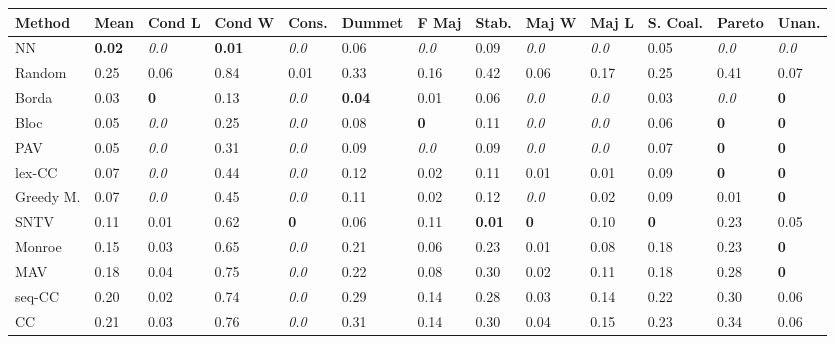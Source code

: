 \begin{tabular}{lllllllllllll}
\toprule
Method & Mean & Cond L & Cond W & Cons. & Dummet & F Maj & Stab. & Maj W & Maj L & S. Coal. & Pareto & Unan. \\
\midrule
NN & \textbf{0.02} & \textit{0.0} & \textbf{0.01} & \textit{0.0} & 0.06 & \textit{0.0} & 0.09 & \textit{0.0} & \textit{0.0} & 0.05 & \textit{0.0} & \textit{0.0} \\
Random & 0.25 & 0.06 & 0.84 & 0.01 & 0.33 & 0.16 & 0.42 & 0.06 & 0.17 & 0.25 & 0.41 & 0.07 \\
Borda & 0.03 & \textbf{0} & 0.13 & \textit{0.0} & \textbf{0.04} & 0.01 & 0.06 & \textit{0.0} & \textit{0.0} & 0.03 & \textit{0.0} & \cellcolor{green!25}\textbf{0} \\
Bloc & 0.05 & \textit{0.0} & 0.25 & \textit{0.0} & 0.08 & \textbf{0} & 0.11 & \textit{0.0} & \textit{0.0} & 0.06 & \textbf{0} & \textbf{0} \\
PAV & 0.05 & \textit{0.0} & 0.31 & \textit{0.0} & 0.09 & \textit{0.0} & 0.09 & \textit{0.0} & \textit{0.0} & 0.07 & \cellcolor{green!25}\textbf{0} & \textbf{0} \\
lex-CC & 0.07 & \textit{0.0} & 0.44 & \textit{0.0} & 0.12 & 0.02 & 0.11 & 0.01 & 0.01 & 0.09 & \textbf{0} & \textbf{0} \\
Greedy M. & 0.07 & \textit{0.0} & 0.45 & \textit{0.0} & 0.11 & 0.02 & 0.12 & \textit{0.0} & 0.02 & 0.09 & 0.01 & \textbf{0} \\
SNTV & 0.11 & 0.01 & 0.62 & \textbf{0} & 0.06 & 0.11 & \textbf{0.01} & \textbf{0} & 0.10 & \textbf{0} & 0.23 & 0.05 \\
Monroe & 0.15 & 0.03 & 0.65 & \cellcolor{green!25}\textit{0.0} & 0.21 & 0.06 & 0.23 & 0.01 & 0.08 & 0.18 & 0.23 & \cellcolor{green!25}\textbf{0} \\
MAV & 0.18 & 0.04 & 0.75 & \textit{0.0} & 0.22 & 0.08 & 0.30 & 0.02 & 0.11 & 0.18 & 0.28 & \textbf{0} \\
seq-CC & 0.20 & 0.02 & 0.74 & \textit{0.0} & 0.29 & 0.14 & 0.28 & 0.03 & 0.14 & 0.22 & 0.30 & 0.06 \\
CC & 0.21 & 0.03 & 0.76 & \cellcolor{green!25}\textit{0.0} & 0.31 & 0.14 & 0.30 & 0.04 & 0.15 & 0.23 & 0.34 & 0.06 \\
\bottomrule
\end{tabular}
